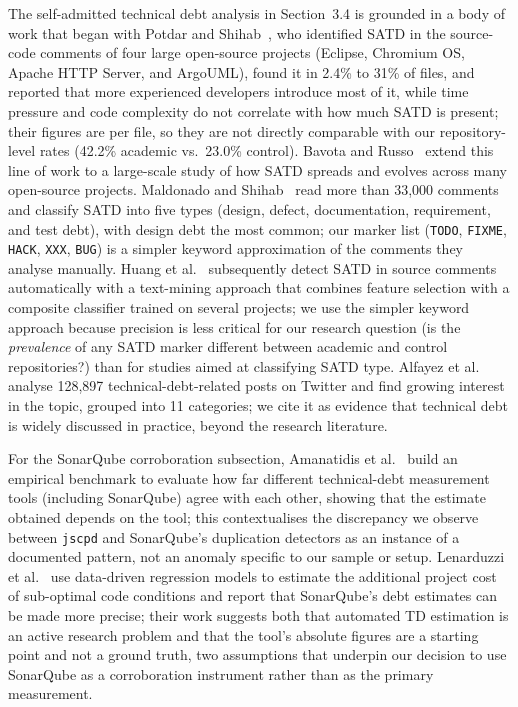 \documentclass{cleiej}
\providecommand{\citep}[1]{\cite{#1}}
\begin{document}
The self-admitted technical debt analysis in Section~3.4 is grounded in a body of work that began with Potdar and Shihab~\citep{potdar2014satd}, who identified SATD in the source-code comments of four large open-source projects (Eclipse, Chromium OS, Apache HTTP Server, and ArgoUML), found it in 2.4\% to 31\% of files, and reported that more experienced developers introduce most of it, while time pressure and code complexity do not correlate with how much SATD is present; their figures are per file, so they are not directly comparable with our repository-level rates (42.2\% academic vs.\ 23.0\% control). Bavota and Russo~\citep{bavota2016satd} extend this line of work to a large-scale study of how SATD spreads and evolves across many open-source projects. Maldonado and Shihab~\citep{maldonado2015satd} read more than 33,000 comments and classify SATD into five types (design, defect, documentation, requirement, and test debt), with design debt the most common; our marker list (\texttt{TODO}, \texttt{FIXME}, \texttt{HACK}, \texttt{XXX}, \texttt{BUG}) is a simpler keyword approximation of the comments they analyse manually. Huang et al.~\citep{huang2018satd} subsequently detect SATD in source comments automatically with a text-mining approach that combines feature selection with a composite classifier trained on several projects; we use the simpler keyword approach because precision is less critical for our research question (is the \emph{prevalence} of any SATD marker different between academic and control repositories?) than for studies aimed at classifying SATD type. Alfayez et al.~\citep{alfayez2023tdtwitter} analyse 128,897 technical-debt-related posts on Twitter and find growing interest in the topic, grouped into 11 categories; we cite it as evidence that technical debt is widely discussed in practice, beyond the research literature.

For the SonarQube corroboration subsection, Amanatidis et al.~\citep{amanatidis2020td} build an empirical benchmark to evaluate how far different technical-debt measurement tools (including SonarQube) agree with each other, showing that the estimate obtained depends on the tool; this contextualises the discrepancy we observe between \texttt{jscpd} and SonarQube's duplication detectors as an instance of a documented pattern, not an anomaly specific to our sample or setup. Lenarduzzi et al.~\citep{lenarduzzi2019surgical} use data-driven regression models to estimate the additional project cost of sub-optimal code conditions and report that SonarQube's debt estimates can be made more precise; their work suggests both that automated TD estimation is an active research problem and that the tool's absolute figures are a starting point and not a ground truth, two assumptions that underpin our decision to use SonarQube as a corroboration instrument rather than as the primary measurement.
\end{document}
